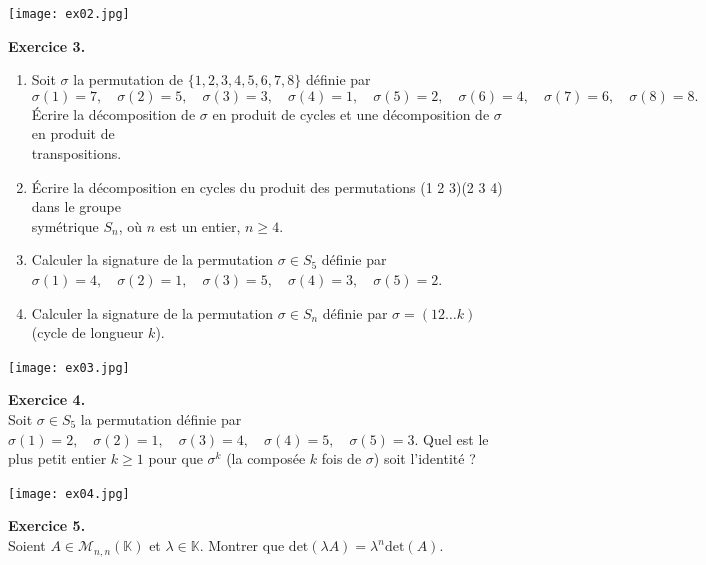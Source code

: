 \documentclass[a4paper, 10pt]{report}
\begin{document}
	\texttt{[image: ex02.jpg]}
	
	\newpage
	
	\fancyhf{}
	\renewcommand{\headrule}
	{\rule{\textwidth}{0pt}}
	
	\noindent
	\textbf{Exercice 3.}
	\begin{enumerate}[label=\arabic*., leftmargin=7mm]
		\item Soit $\sigma$ la permutation de $\{1, 2, 3, 4, 5, 6, 7, 8\}$
		définie par \[\sigma(1) = 7, \quad \sigma(2) = 5, \quad
		\sigma(3) = 3, \quad \sigma(4) = 1, \quad \sigma(5) = 2, \quad
		\sigma(6) = 4, \quad \sigma(7) = 6, \quad \sigma(8) = 8.\]
		Écrire la décomposition de $\sigma$ en produit de cycles
		et une décomposition de $\sigma$ en produit de\\ transpositions.
		\item Écrire la décomposition en cycles du produit des permutations
		(1 2 3)(2 3 4) dans le groupe\\ symétrique $S_n$, où $n$ est un
		entier, $n \geq 4$.
		\item Calculer la signature de la permutation $\sigma \in S_5$
		définie par\\ $\sigma(1) = 4, \quad \sigma(2) = 1, \quad
		\sigma(3) = 5, \quad \sigma(4) = 3, \quad \sigma(5) = 2.$
		\item Calculer la signature de la permutation $\sigma \in S_n$
		définie par $\sigma = (1 2 \dotso k)$ (cycle de longueur $k$).
	\end{enumerate}
	
	\texttt{[image: ex03.jpg]}
	
	\vspace{5mm}
	\noindent
	\textbf{Exercice 4.}\\
	Soit $\sigma \in S_5$ la permutation définie par $\sigma(1) = 2,
		\quad \sigma(2) = 1, \quad \sigma(3) = 4, \quad \sigma(4) = 5,
		\quad \sigma(5) = 3$. Quel est le plus petit entier $k \geq 1$
	pour que $\sigma^k$ (la composée $k$ fois de $\sigma$) soit l'identité ?
	
	\texttt{[image: ex04.jpg]}
	
	\vspace{5mm}
	\noindent
	\textbf{Exercice 5.}\\
	Soient $A \in \mathcal{M}_{n, n}(\mathbb{K})$ et
	$\lambda \in \mathbb{K}$. Montrer que $\mathrm{det}(\lambda A)
		= \lambda^n \mathrm{det}(A)$.
		
\end{document}
